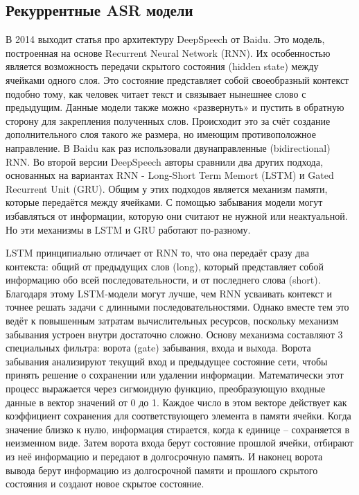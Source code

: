 \subsection{Рекуррентные ASR модели}
В 2014 выходит статья про архитектуру DeepSpeech\cite{hannun2014deep} от Baidu. 
Это модель, построенная на основе Recurrent Neural Network (RNN).
Их особенностью является возможность передачи скрытого состояния (hidden state) между ячейками одного слоя.
Это состояние представляет собой своеобразный контекст подобно тому, как человек читает текст и связывает нынешнее слово с предыдущим.
Данные модели также можно «развернуть» и пустить в обратную сторону для закрепления полученных слов.
Происходит это за счёт создание дополнительного слоя такого же размера, но имеющим противоположное направление.
В Baidu как раз использовали двунаправленные (bidirectional) RNN.
Во второй версии DeepSpeech\cite{amodei2016deep} авторы сравнили два других подхода, основанных на вариантах RNN - Long-Short Term Memort (LSTM) и Gated Recurrent Unit (GRU).
Общим у этих подходов является механизм памяти, которые передаётся между ячейками.
С помощью забывания модели могут избавляться от информации, которую они считают не нужной или неактуальной.
Но эти механизмы в LSTM и GRU работают по-разному.

LSTM принципиально отличает от RNN то, что она передаёт сразу два контекста: общий от предыдущих слов (long), который представляет собой информацию обо всей последовательности, и от последнего слова (short).
Благодаря этому LSTM-модели могут лучше, чем RNN усваивать контекст и точнее решать задачи с длинными последовательностями.
Однако вместе тем это ведёт к повышенным затратам вычислительных ресурсов, поскольку механизм забывания устроен внутри достаточно сложно.
Основу механизма составляют 3 специальных фильтра: ворота (gate) забывания, входа и выхода.
Ворота забывания анализируют текущий вход и предыдущее состояние сети, чтобы принять решение о сохранении или удалении информации.
Математически этот процесс выражается через сигмоидную функцию, преобразующую входные данные в вектор значений от 0 до 1.
Каждое число в этом векторе действует как коэффициент сохранения для соответствующего элемента в памяти ячейки.
Когда значение близко к нулю, информация стирается, когда к единице -- сохраняется в неизменном виде.
Затем ворота входа берут состояние прошлой ячейки, отбирают из неё информацию и передают в долгосрочную память.
И наконец ворота вывода берут информацию из долгосрочной памяти и прошлого скрытого состояния и создают новое скрытое состояние.

